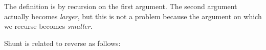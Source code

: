 The definition is by recursion on the first argument. The second
argument actually becomes \emph{larger}, but this is not a problem
because the argument on which we recurse becomes \emph{smaller}.

Shunt is related to reverse as follows:

\begin{fence}
\begin{code}%
\>[0]\AgdaSpace{}%
\AgdaSymbol{:}\AgdaSpace{}%
\AgdaSpace{}%
\AgdaSymbol{\{}\AgdaSpace{}%
\AgdaSymbol{:}\AgdaSpace{}%
\AgdaSymbol{\}}\AgdaSpace{}%
\AgdaSymbol{(}\AgdaSpace{}%
\AgdaSpace{}%
\AgdaSymbol{:}\AgdaSpace{}%
\AgdaSpace{}%
\AgdaSymbol{)}\<%
\\
\>[0][@{}l@{\AgdaIndent{0}}]%
\>[2]\AgdaSpace{}%
\AgdaSpace{}%
\AgdaSpace{}%
\AgdaSpace{}%
\AgdaSpace{}%
\AgdaSpace{}%
\AgdaSpace{}%
\AgdaOperator{\AgdaFunction{++}}\AgdaSpace{}%
\<%
\\
\>[0]\AgdaSpace{}%
\AgdaInductiveConstructor{[]}\AgdaSpace{}%
\AgdaSpace{}%
\AgdaSymbol{=}\<%
\\
\>[0][@{}l@{\AgdaIndent{0}}]%
\>[2]\<%
\\
\>[2][@{}l@{\AgdaIndent{0}}]%
\>[4]\AgdaSpace{}%
\AgdaInductiveConstructor{[]}\AgdaSpace{}%
\<%
\\
%
\>[2]\<%
\\
\>[2][@{}l@{\AgdaIndent{0}}]%
\>[4]\<%
\\
%
\>[2]\<%
\\
\>[2][@{}l@{\AgdaIndent{0}}]%
\>[4]\AgdaSpace{}%
\AgdaInductiveConstructor{[]}\AgdaSpace{}%
\AgdaOperator{\AgdaFunction{++}}\AgdaSpace{}%
\<%
\\
%
\>[2]\<%
\\
\>[0]\AgdaSpace{}%
\AgdaSymbol{(}\AgdaSpace{}%
\AgdaSpace{}%
\AgdaSymbol{)}\AgdaSpace{}%
\AgdaSpace{}%
\AgdaSymbol{=}\<%
\\
\>[0][@{}l@{\AgdaIndent{0}}]%
\>[2]\<%

\end{code}
\end{fence}
